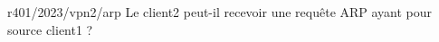 \begin{question}{r401/2023/vpn2/arp}
  Le client2 peut-il recevoir une requête ARP ayant pour source client1 ?
  \begin{reponseshoriz}
  \end{reponseshoriz}
\end{question}

